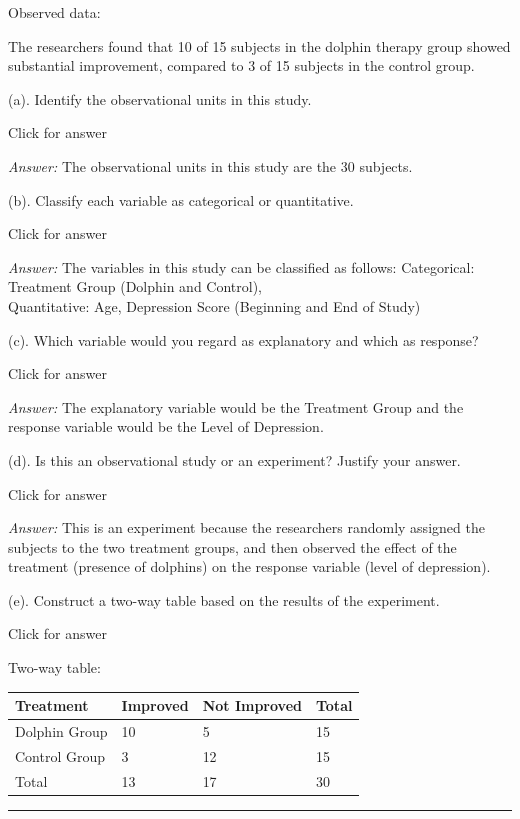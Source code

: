 \documentclass[
]{book}
\begin{document}
Observed data:

The researchers found that 10 of 15 subjects in the dolphin therapy group showed substantial improvement, compared to 3 of 15 subjects in the control group.

(a). Identify the observational units in this study.

Click for answer

\emph{Answer:} The observational units in this study are the 30 subjects.

(b). Classify each variable as categorical or quantitative.

Click for answer

\emph{Answer:} The variables in this study can be classified as follows:
Categorical: Treatment Group (Dolphin and Control),\\
Quantitative: Age, Depression Score (Beginning and End of Study)

(c). Which variable would you regard as explanatory and which as response?

Click for answer

\emph{Answer:} The explanatory variable would be the Treatment Group and the response variable would be the Level of Depression.

(d). Is this an observational study or an experiment? Justify your answer.

Click for answer

\emph{Answer:} This is an experiment because the researchers randomly assigned the subjects to the two treatment groups, and then observed the effect of the treatment (presence of dolphins) on the response variable (level of depression).

(e). Construct a two-way table based on the results of the experiment.

Click for answer

Two-way table:

\begin{longtable}[]{@{}llll@{}}
\toprule()
Treatment & Improved & Not Improved & Total \\
\midrule()
\endhead
Dolphin Group & 10 & 5 & 15 \\
Control Group & 3 & 12 & 15 \\
Total & 13 & 17 & 30 \\
\bottomrule()
\end{longtable}

\begin{center}\rule{0.5\linewidth}{0.5pt}\end{center}
\end{document}
